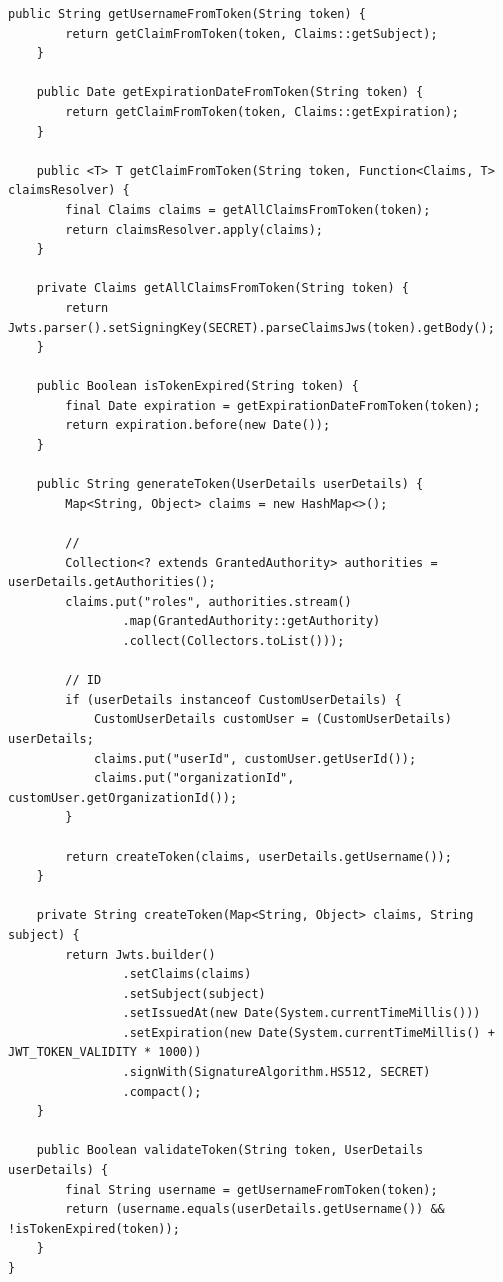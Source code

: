 \begin{lstlisting}[style=java]
    public String getUsernameFromToken(String token) {
        return getClaimFromToken(token, Claims::getSubject);
    }
    
    public Date getExpirationDateFromToken(String token) {
        return getClaimFromToken(token, Claims::getExpiration);
    }
    
    public <T> T getClaimFromToken(String token, Function<Claims, T> claimsResolver) {
        final Claims claims = getAllClaimsFromToken(token);
        return claimsResolver.apply(claims);
    }
    
    private Claims getAllClaimsFromToken(String token) {
        return Jwts.parser().setSigningKey(SECRET).parseClaimsJws(token).getBody();
    }
    
    public Boolean isTokenExpired(String token) {
        final Date expiration = getExpirationDateFromToken(token);
        return expiration.before(new Date());
    }
    
    public String generateToken(UserDetails userDetails) {
        Map<String, Object> claims = new HashMap<>();
        
        // 
        Collection<? extends GrantedAuthority> authorities = userDetails.getAuthorities();
        claims.put("roles", authorities.stream()
                .map(GrantedAuthority::getAuthority)
                .collect(Collectors.toList()));
                
        // ID
        if (userDetails instanceof CustomUserDetails) {
            CustomUserDetails customUser = (CustomUserDetails) userDetails;
            claims.put("userId", customUser.getUserId());
            claims.put("organizationId", customUser.getOrganizationId());
        }
        
        return createToken(claims, userDetails.getUsername());
    }
    
    private String createToken(Map<String, Object> claims, String subject) {
        return Jwts.builder()
                .setClaims(claims)
                .setSubject(subject)
                .setIssuedAt(new Date(System.currentTimeMillis()))
                .setExpiration(new Date(System.currentTimeMillis() + JWT_TOKEN_VALIDITY * 1000))
                .signWith(SignatureAlgorithm.HS512, SECRET)
                .compact();
    }
    
    public Boolean validateToken(String token, UserDetails userDetails) {
        final String username = getUsernameFromToken(token);
        return (username.equals(userDetails.getUsername()) && !isTokenExpired(token));
    }
}


\end{lstlisting}

